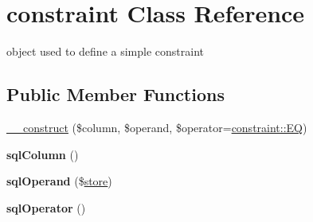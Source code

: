 \hypertarget{classconstraint}{\section{constraint Class Reference}
\label{classconstraint}
}


object used to define a simple constraint  


\subsection*{Public Member Functions}
\begin{DoxyCompactItemize}
\item 
\hyperlink{classconstraint_a9e4321b5cf73af8119e6ecaac6069bbc}{\-\_\-\-\_\-construct} (\$column, \$operand, \$operator=\hyperlink{classconstraint_ac28f80db55e3b33606f846cf0b2938d5}{constraint\-::\-E\-Q})
\item 
\hypertarget{classconstraint_a0dc612f1698478d40bb6d7f5e89cd690}{{\bfseries sql\-Column} ()}\label{classconstraint_a0dc612f1698478d40bb6d7f5e89cd690}

\item 
\hypertarget{classconstraint_a71d68e9b1fcebe282598a3b678bfb267}{{\bfseries sql\-Operand} (\$\hyperlink{classstore}{store})}\label{classconstraint_a71d68e9b1fcebe282598a3b678bfb267}

\item 
\hypertarget{classconstraint_ae06aa3a7e4d5cc910bc69d38c8234bb9}{{\bfseries sql\-Operator} ()}\label{classconstraint_ae06aa3a7e4d5cc910bc69d38c8234bb9}

\end{DoxyCompactItemize}
